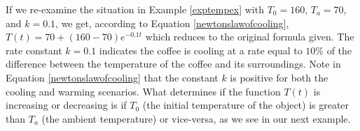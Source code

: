 
\smallskip


\smallskip 

If we re-examine the situation in Example \ref{exptempex} with $T_{0} = 160$, $T_{a} = 70$, and $k = 0.1$, we get, according to Equation \ref{newtonslawofcooling}, $T(t) = 70 + (160 - 70)e^{-0.1t}$ which reduces to the original formula given.  The rate constant $k = 0.1$ indicates the coffee is cooling at a rate equal to $10 \%$ of the difference between the temperature of the coffee and its surroundings.  Note in Equation \ref{newtonslawofcooling} that the constant $k$ is positive for both the cooling and warming scenarios.  What determines if the function $T(t)$ is increasing or decreasing is if $T_{0}$ (the initial temperature of the object) is greater than $T_{a}$ (the ambient temperature) or vice-versa, as we see in our next example.

\medskip

